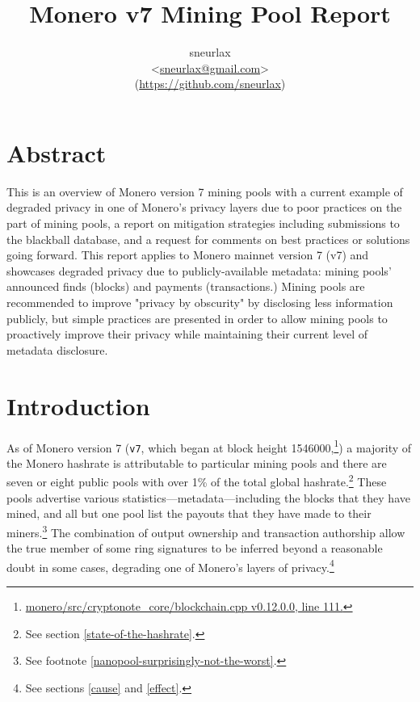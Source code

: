 \documentclass[notitlepage]{report}
\title{Monero v7 Mining Pool Report}
\author{sneurlax \\
\textless\url{sneurlax@gmail.com}\textgreater \\
(\url{https://github.com/sneurlax})}
\begin{document}
\maketitle
\thispagestyle{empty}

\section*{Abstract}

This is an overview of Monero version 7 mining pools with a current example of degraded privacy in one of Monero's privacy layers due to poor practices on the part of mining pools, a report on mitigation strategies including submissions to the blackball database, and a request for comments on best practices or solutions going forward.  This report applies to Monero mainnet version 7 (v7) and showcases degraded privacy due to publicly-available metadata: mining pools' announced finds (blocks) and payments (transactions.)  Mining pools are recommended to improve "privacy by obscurity" by disclosing less information publicly, but simple practices are presented in order to allow mining pools to proactively improve their privacy while maintaining their current level of metadata disclosure.

\clearpage

\tableofcontents

\section{Introduction}
\setcounter{chapter}{1}

\setcounter{page}{1} %

As of Monero version 7 (\verb/v7/, which began at block height 1546000,\footnote{\href{https://github.com/monero-project/monero/blob/93e76e14a205a84cbea8ab0a3e35f37bf9d08b42/src/cryptonote_core/blockchain.cpp\#L111}{monero/src/cryptonote\_core/blockchain.cpp v0.12.0.0, line 111.}}) a majority of the Monero hashrate is attributable to particular mining pools and there are seven or eight public pools with over 1\% of the total global hashrate.\footnote{See section \ref{state-of-the-hashrate}.}  These pools advertise various statistics---metadata---including the blocks that they have mined, and all but one pool list the payouts that they have made to their miners.\footnote{See footnote \ref{nanopool-surprisingly-not-the-worst}.}  The combination of output ownership and transaction authorship allow the true member of some ring signatures to be inferred beyond a reasonable doubt in some cases, degrading one of Monero's layers of privacy.\footnote{See sections \ref{cause} and \ref{effect}.}
\end{document}
